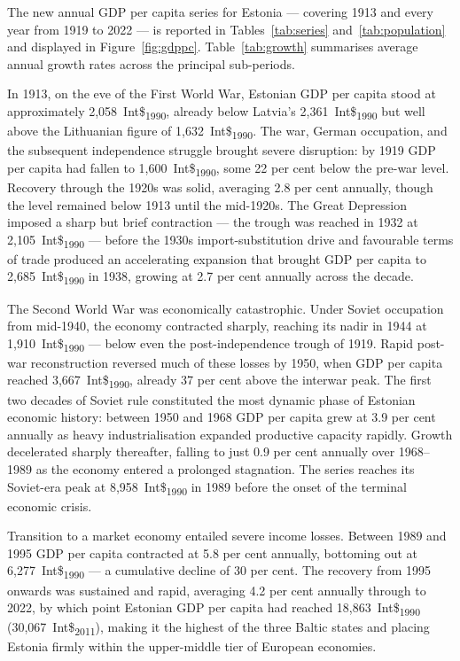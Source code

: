 \documentclass[12pt,a4paper]{article}
\newcommand{\intlnineteen}{Int\$\textsubscript{1990}}   %
\newcommand{\intltwenty}{Int\$\textsubscript{2011}}     %
\begin{document}
The new annual GDP per capita series for Estonia — covering 1913 and every year from 1919 to 2022 — is reported in Tables~\ref{tab:series} and~\ref{tab:population} and displayed in Figure~\ref{fig:gdppc}. Table~\ref{tab:growth} summarises average annual growth rates across the principal sub-periods.

In 1913, on the eve of the First World War, Estonian GDP per capita stood at approximately 2,058~\intlnineteen{}, already below Latvia's 2,361~\intlnineteen{} but well above the Lithuanian figure of 1,632~\intlnineteen{}. The war, German occupation, and the subsequent independence struggle brought severe disruption: by 1919 GDP per capita had fallen to 1,600~\intlnineteen{}, some 22 per cent below the pre-war level. Recovery through the 1920s was solid, averaging 2.8 per cent annually, though the level remained below 1913 until the mid-1920s. The Great Depression imposed a sharp but brief contraction — the trough was reached in 1932 at 2,105~\intlnineteen{} — before the 1930s import-substitution drive and favourable terms of trade produced an accelerating expansion that brought GDP per capita to 2,685~\intlnineteen{} in 1938, growing at 2.7 per cent annually across the decade.

The Second World War was economically catastrophic. Under Soviet occupation from mid-1940, the economy contracted sharply, reaching its nadir in 1944 at 1,910~\intlnineteen{} — below even the post-independence trough of 1919. Rapid post-war reconstruction reversed much of these losses by 1950, when GDP per capita reached 3,667~\intlnineteen{}, already 37 per cent above the interwar peak. The first two decades of Soviet rule constituted the most dynamic phase of Estonian economic history: between 1950 and 1968 GDP per capita grew at 3.9 per cent annually as heavy industrialisation expanded productive capacity rapidly. Growth decelerated sharply thereafter, falling to just 0.9 per cent annually over 1968--1989 as the economy entered a prolonged stagnation. The series reaches its Soviet-era peak at 8,958~\intlnineteen{} in 1989 before the onset of the terminal economic crisis.

Transition to a market economy entailed severe income losses. Between 1989 and 1995 GDP per capita contracted at 5.8 per cent annually, bottoming out at 6,277~\intlnineteen{} — a cumulative decline of 30 per cent. The recovery from 1995 onwards was sustained and rapid, averaging 4.2 per cent annually through to 2022, by which point Estonian GDP per capita had reached 18,863~\intlnineteen{} (30,067~\intltwenty{}), making it the highest of the three Baltic states and placing Estonia firmly within the upper-middle tier of European economies.
\end{document}
